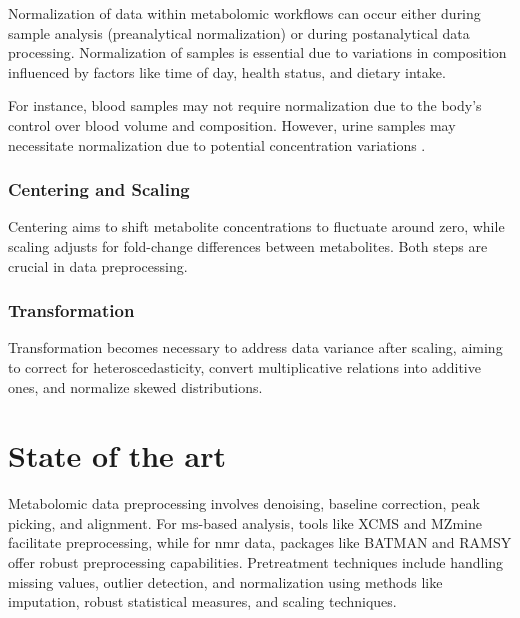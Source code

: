 \documentclass[ENG, BIB]{TFUOC}%
\begin{document}
Normalization of data within metabolomic workflows can occur either during sample analysis (preanalytical normalization) or during postanalytical data processing. Normalization of samples is essential due to variations in composition influenced by factors like time of day, health status, and dietary intake. 

For instance, blood samples may not require normalization due to the body's control over blood volume and composition. However, urine samples may necessitate normalization due to potential concentration variations \cite{ulaszewskaNutrimetabolomicsIntegrativeAction2019a}.


\subsubsection{Centering and Scaling}

 Centering aims to shift metabolite concentrations to fluctuate around zero, while scaling adjusts for fold-change differences between metabolites. Both steps are crucial in data preprocessing.

\subsubsection[Transf]{Transformation}

Transformation becomes necessary to address data variance after scaling, aiming to correct for heteroscedasticity, convert multiplicative relations into additive ones, and normalize skewed distributions.

\section{State of the art}



Metabolomic data preprocessing involves denoising, baseline correction, peak picking, and alignment. For \acrshort{ms}-based analysis, tools like XCMS and MZmine facilitate preprocessing, while for \acrshort{nmr} data, packages like BATMAN and RAMSY offer robust preprocessing capabilities. Pretreatment techniques include handling missing values, outlier detection, and normalization using methods like imputation, robust statistical measures, and scaling techniques.
\end{document}

